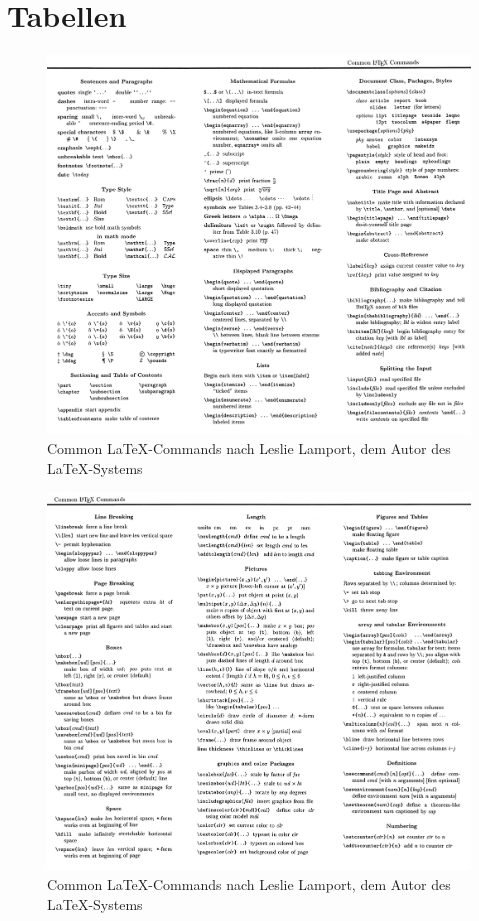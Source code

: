 \documentclass[10pt]{report}
\begin{document}
\section{Tabellen}
\begin{figure}[htbp] %
\centering
\includegraphics[width=0.9\linewidth]{./pic/CommonLaTeXCommands_001.jpeg}
\caption{Common \LaTeX-Commands nach Leslie Lamport, dem Autor des \LaTeX-Systems}
\label{fig:03}
\end{figure}
\begin{figure}[htbp] %
\centering
\includegraphics[width=0.9\linewidth]{./pic/CommonLaTeXCommands_002.jpeg}
\caption{Common \LaTeX-Commands nach Leslie Lamport, dem Autor des \LaTeX-Systems}
\label{fig:04}
\end{figure}
\clearpage
\end{document}
